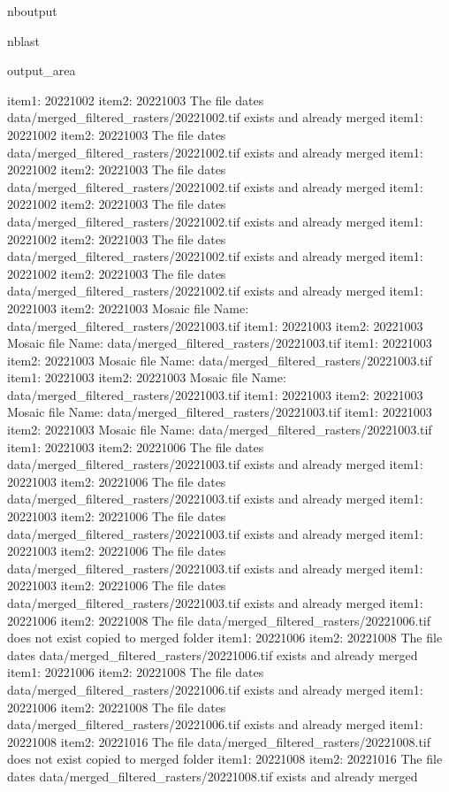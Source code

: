 \documentclass[letterpaper,10pt]{sphinxmanual}
\begin{document}
\begin{sphinxuseclass}{nboutput}
\begin{sphinxuseclass}{nblast}
{\begin{sphinxuseclass}{output_area}
\begin{sphinxuseclass}{}
\begin{sphinxVerbatim}[commandchars=\\\{\}]
item1:  20221002
item2:  20221003
The file dates data/merged\_filtered\_rasters/20221002.tif exists and already merged
item1:  20221002
item2:  20221003
The file dates data/merged\_filtered\_rasters/20221002.tif exists and already merged
item1:  20221002
item2:  20221003
The file dates data/merged\_filtered\_rasters/20221002.tif exists and already merged
item1:  20221002
item2:  20221003
The file dates data/merged\_filtered\_rasters/20221002.tif exists and already merged
item1:  20221002
item2:  20221003
The file dates data/merged\_filtered\_rasters/20221002.tif exists and already merged
item1:  20221002
item2:  20221003
The file dates data/merged\_filtered\_rasters/20221002.tif exists and already merged
item1:  20221003
item2:  20221003
Mosaic file Name:  data/merged\_filtered\_rasters/20221003.tif
item1:  20221003
item2:  20221003
Mosaic file Name:  data/merged\_filtered\_rasters/20221003.tif
item1:  20221003
item2:  20221003
Mosaic file Name:  data/merged\_filtered\_rasters/20221003.tif
item1:  20221003
item2:  20221003
Mosaic file Name:  data/merged\_filtered\_rasters/20221003.tif
item1:  20221003
item2:  20221003
Mosaic file Name:  data/merged\_filtered\_rasters/20221003.tif
item1:  20221003
item2:  20221003
Mosaic file Name:  data/merged\_filtered\_rasters/20221003.tif
item1:  20221003
item2:  20221006
The file dates data/merged\_filtered\_rasters/20221003.tif exists and already merged
item1:  20221003
item2:  20221006
The file dates data/merged\_filtered\_rasters/20221003.tif exists and already merged
item1:  20221003
item2:  20221006
The file dates data/merged\_filtered\_rasters/20221003.tif exists and already merged
item1:  20221003
item2:  20221006
The file dates data/merged\_filtered\_rasters/20221003.tif exists and already merged
item1:  20221003
item2:  20221006
The file dates data/merged\_filtered\_rasters/20221003.tif exists and already merged
item1:  20221006
item2:  20221008
The file data/merged\_filtered\_rasters/20221006.tif does not exist copied to merged folder
item1:  20221006
item2:  20221008
The file dates data/merged\_filtered\_rasters/20221006.tif exists and already merged
item1:  20221006
item2:  20221008
The file dates data/merged\_filtered\_rasters/20221006.tif exists and already merged
item1:  20221006
item2:  20221008
The file dates data/merged\_filtered\_rasters/20221006.tif exists and already merged
item1:  20221008
item2:  20221016
The file data/merged\_filtered\_rasters/20221008.tif does not exist copied to merged folder
item1:  20221008
item2:  20221016
The file dates data/merged\_filtered\_rasters/20221008.tif exists and already merged

\end{sphinxVerbatim}
\end{sphinxuseclass}
\end{sphinxuseclass}}
\end{sphinxuseclass}
\end{sphinxuseclass}
\end{document}
